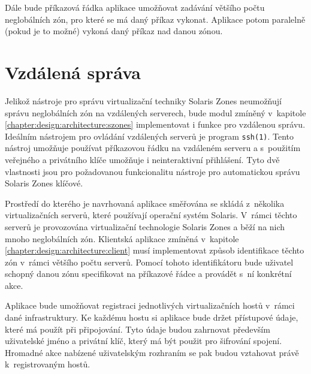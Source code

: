 Dále bude příkazová řádka aplikace umožňovat zadávání většího počtu neglobálních zón, pro které se má daný příkaz vykonat. Aplikace
potom paralelně (pokud je to možné) vykoná daný příkaz nad danou zónou.
\section{Vzdálená správa}
\label{chapter:design:remote}
Jelikož nástroje pro správu virtualizační techniky Solaris Zones neumožňují správu neglobálních zón na vzdálených serverech,
bude modul zmíněný v~kapitole \ref{chapter:design:architecture:szones} implementovat i funkce pro vzdálenou správu. Ideálním
nástrojem pro ovládání vzdálených serverů je program \verb|ssh(1)|. Tento nástroj umožňuje používat příkazovou řádku na 
vzdáleném serveru a s~použitím veřejného a privátního klíče umožňuje i neinteraktivní přihlášení. Tyto dvě vlastnosti jsou
pro požadovanou funkcionalitu nástroje pro automatickou správu Solaris Zones klíčové.

Prostředí do kterého je navrhovaná aplikace směřována se skládá z~několika virtualizačních serverů, které používají operační
systém Solaris. V~rámci těchto serverů je provozována virtualizační technologie Solaris Zones a běží na nich mnoho neglobálních
zón. Klientská aplikace zmíněná v~kapitole \ref{chapter:design:architecture:client} musí implementovat způsob identifikace
těchto zón v~rámci většího počtu serverů. Pomocí tohoto identifikátoru bude uživatel schopný danou zónu specifikovat na příkazové
řádce a provádět s~ní konkrétní akce.

Aplikace bude umožňovat registraci jednotlivých virtualizačních hostů v~rámci dané infrastruktury. Ke každému hostu si aplikace
bude držet přístupové údaje, které má použít při připojování. Tyto údaje budou zahrnovat především uživatelské jméno a 
privátní klíč, který má být použit pro šifrování spojení. Hromadné akce nabízené uživatelským rozhraním se pak budou vztahovat
právě k~registrovaným hostů.
